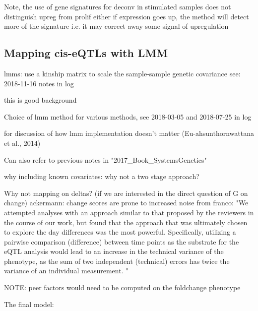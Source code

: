 Note, the use of gene signatures for deconv
    in stimulated samples
    does not distinguish upreg from prolif either
    if expression goes up, the method will detect more of the signature
    i.e. it may correct away some signal of upregulation


\subsection{Mapping cis-eQTLs with LMM}

lmms: use a kinship matrix to scale the sample-sample genetic covariance
see: 2018-11-16 notes in log

this is good background

Choice of lmm method
for various methods, see 2018-03-05 and 2018-07-25 in log

for discussion of how lmm implementation doesn't matter (Eu-ahsunthornwattana et al., 2014)

Can also refer to previous notes in "2017\_Book\_SystemsGenetics"

why including known covariates: why not a two stage approach?

Why not mapping on deltas? (if we are interested in the direct question of G on change)
    ackermann: change scores are prone to increased noise
    from franco: "We attempted analyses with an approach similar to that proposed by the reviewers in the course of our work, but found that the approach that was ultimately chosen to explore the day differences was the most powerful. Specifically, utilizing a pairwise comparison (difference) between time points as the substrate for the eQTL analysis would lead to an increase in the technical variance of the phenotype, as the sum of two independent (technical) errors has twice the variance of an individual measurement. "

    NOTE: peer factors would need to be computed on the foldchange phenotype

The final model:

